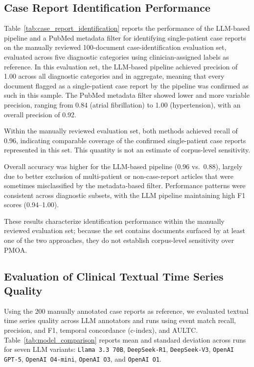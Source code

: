 \documentclass[pdflatex,sn-mathphys-num]{sn-jnl}%
\newif\ifshowrebuttalcolor
\newcommand{\rebuttal}[1]{%
  \ifshowrebuttalcolor
    \textcolor{rebuttalblue}{#1}%
  \else
    #1%
  \fi
}
\theoremstyle{thmstyleone}%
\theoremstyle{thmstyletwo}%
\theoremstyle{thmstylethree}%
\begin{document}
\subsection{Case Report Identification Performance}
\label{sec:case-report-identification-performance}



Table~\ref{tab:case_report_identification} reports the performance of the LLM-based pipeline and a PubMed metadata filter for identifying single-patient case reports on the manually reviewed 100-document case-identification evaluation set, evaluated across five diagnostic categories using clinician-assigned labels as reference. In this evaluation set, the LLM-based pipeline achieved precision of 1.00 across all diagnostic categories and in aggregate, meaning that every document flagged as a single-patient case report by the pipeline was confirmed as such in this sample. The PubMed metadata filter showed lower and more variable precision, ranging from 0.84 (atrial fibrillation) to 1.00 (hypertension), with an overall precision of 0.92. 
\rebuttal{
Within the manually reviewed evaluation set, both methods achieved recall of 0.96, indicating comparable coverage of the confirmed single-patient case reports represented in this set. This quantity is not an estimate of corpus-level sensitivity.
}

Overall accuracy was higher for the LLM-based pipeline (0.96 vs.\ 0.88), largely due to better exclusion of multi-patient or non-case-report articles that were sometimes misclassified by the metadata-based filter. Performance patterns were consistent across diagnostic subsets, with the LLM pipeline maintaining high F1 scores (0.94--1.00). 
\rebuttal{
These results characterize identification performance within the manually reviewed evaluation set; because the set contains documents surfaced by at least one of the two approaches, they do not establish corpus-level sensitivity over PMOA.
}

\subsection{Evaluation of Clinical Textual Time Series Quality}
\label{sec:evaluation-of-tts-quality}

Using the 200 manually annotated case reports as reference, we evaluated textual time series quality across LLM annotators and runs using event match recall, precision, and F1, temporal concordance (c-index), and AULTC. Table~\ref{tab:model_comparison} reports mean and standard deviation across runs for seven LLM variants: \texttt{Llama 3.3 70B}, \texttt{DeepSeek-R1}, \texttt{DeepSeek-V3}, \texttt{OpenAI GPT-5}, \texttt{OpenAI O4-mini}, \texttt{OpenAI O3}, and \texttt{OpenAI O1}.
\end{document}

